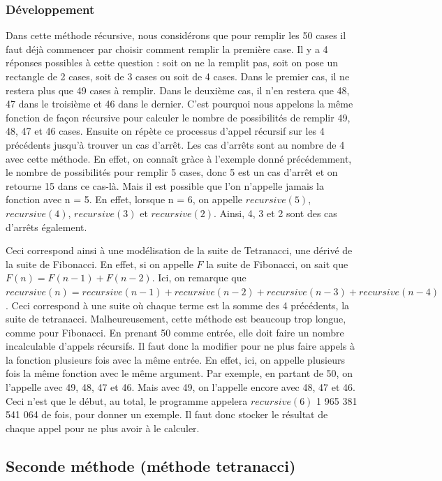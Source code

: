 \documentclass{article}
\begin{document}
\bigbreak


\subsubsection{Développement}
Dans cette méthode récursive, nous considérons que pour remplir les 50 cases il faut déjà commencer par choisir comment remplir la première case. Il y a 4 réponses possibles à cette question : soit on ne la remplit pas, soit on pose un rectangle de 2 cases, soit de 3 cases ou soit de 4 cases. Dans le premier cas, il ne restera plus que 49 cases à remplir. Dans le deuxième cas, il n'en restera que 48, 47 dans le troisième et 46 dans le dernier. C'est pourquoi nous appelons la même fonction de façon récursive pour calculer le nombre de possibilités de remplir 49, 48, 47 et 46 cases. Ensuite on répète ce processus d'appel récursif sur les 4 précédents jusqu'à trouver un cas d'arrêt. Les cas d'arrêts sont au nombre de 4 avec cette méthode. En effet, on connaît gràce à l'exemple donné précédemment, le nombre de possibilités pour remplir 5 cases, donc 5 est un cas d'arrêt et on retourne 15 dans ce cas-là. Mais il est possible que l'on n'appelle jamais la fonction avec n = 5. En effet, lorsque n = 6, on appelle $recursive(5)$, $recursive(4)$, $recursive(3)$ et $recursive(2)$. Ainsi, 4, 3 et 2 sont des cas d'arrêts également.

Ceci correspond ainsi à une modélisation de la suite de Tetranacci, une dérivé de la suite de Fibonacci. En effet, si on appelle $F$ la suite de Fibonacci, on sait que $F(n) = F(n-1) + F(n-2)$. Ici, on remarque que $recursive(n) = recursive(n-1) + recursive(n-2) + recursive(n-3) + recursive(n-4)$. Ceci correspond à une suite où chaque terme est la somme des 4 précédents, la suite de tetranacci. Malheureusement, cette méthode est beaucoup trop longue, comme pour Fibonacci. En prenant 50 comme entrée, elle doit faire un nombre incalculable d'appels récursifs. Il faut donc la modifier pour ne plus faire appels à la fonction plusieurs fois avec la même entrée. En effet, ici, on appelle plusieurs fois la même fonction avec le même argument. Par exemple, en partant de 50, on l'appelle avec 49, 48, 47 et 46. Mais avec 49, on l'appelle encore avec 48, 47 et 46. Ceci n'est que le début, au total, le programme appelera $recursive(6)$ 1 965 381 541 064 de fois, pour donner un exemple. Il faut donc stocker le résultat de chaque appel pour ne plus avoir à le calculer.
\subsection{Seconde méthode (méthode tetranacci)}
\end{document}
